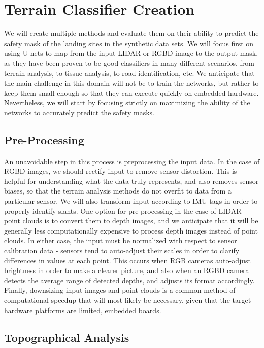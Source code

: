 \section{Terrain Classifier Creation}

We will create multiple methods and evaluate them on their ability to predict the
safety mask of the landing sites in the synthetic data sets.
We will focus first on using U-nets to map from the input LIDAR or RGBD image
to the output mask, as they have been proven to be good classifiers in many different scenarios,
from terrain analysis, to tissue analysis, to road identification, etc.
We anticipate that the main challenge in this domain will not be
to train the networks, but rather to keep them small enough
so that they can execute quickly on embedded hardware.
Nevertheless, we will start by focusing strictly on maximizing the ability of the networks
to accurately predict the safety masks.

\subsection{Pre-Processing}

An unavoidable step in this process is preprocessing the input data.
In the case of RGBD images, we should rectify input to remove sensor distortion.
This is helpful for understanding what the data truly represents,
and also removes sensor biases, so that the terrain analysis methods do not overfit to data from a particular sensor.
We will also transform input according to IMU tags in order to properly identify slants.
One option for pre-processing in the case of LIDAR point clouds is to convert them to depth images,
and we anticipate that it will be generally less computationally expensive to process depth images instead of point clouds.
In either case, the input must be normalized with respect to sensor calibration data -
sensors tend to auto-adjust their scales in order to clarify differences in values at each point.
This occurs when RGB cameras auto-adjust brightness in order to make a clearer picture,
and also when an RGBD camera detects the average range of detected depths, and adjusts its format accordingly.
Finally, downsizing input images and point clouds is a common method of computational speedup
that will most likely be necessary, given that the target hardware platforms are limited, embedded boards.

\subsection{Topographical Analysis}

